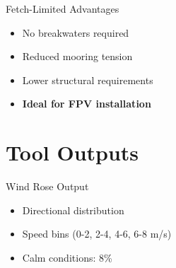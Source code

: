 \documentclass[10pt]{beamer}
\begin{document}
\begin{frame}{Fetch-Limited Advantages}
\begin{center}
\end{center}

\begin{itemize}
    \item No breakwaters required
    \item Reduced mooring tension
    \item Lower structural requirements
    \item \textbf{Ideal for FPV installation}
\end{itemize}
\end{frame}

\section{Tool Outputs}

\begin{frame}{Wind Rose Output}
\begin{center}
\end{center}

\begin{itemize}
    \item Directional distribution
    \item Speed bins (0-2, 2-4, 4-6, 6-8 m/s)
    \item Calm conditions: 8\%
\end{itemize}
\end{frame}
\end{document}
